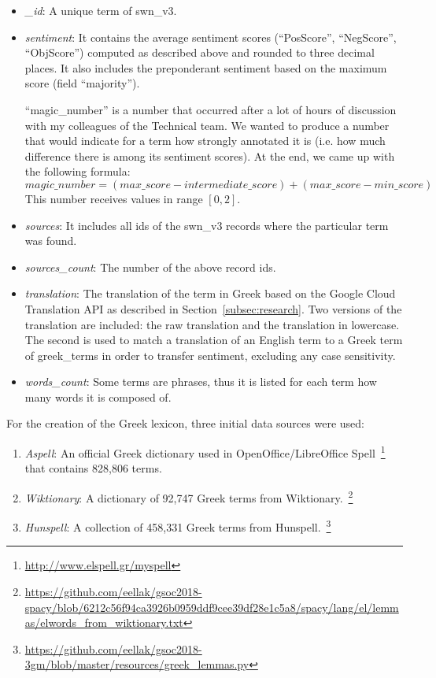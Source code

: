 \begin{itemize}
 \item \emph{\_id}: A unique term of swn\_v3.

 \item \emph{sentiment}: It contains the average sentiment scores
 (``PosScore'', ``NegScore'', ``ObjScore'') computed as described above
 and rounded to three decimal places.
 It also includes the preponderant sentiment based on the maximum score
 (field ``majority'').

 ``magic\_number'' is a number that occurred after a lot of hours
 of discussion with my colleagues of the Technical team.
 We wanted to produce a number that would indicate for a term
 how strongly annotated it is
 (i.e. how much difference there is among its sentiment scores).
 At the end, we came up with the following formula: \\
 $magic\_number = (max\_score - intermediate\_score) + (max\_score - min\_score)$ \\
 This number receives values in range $[0,2]$.
 
 \item \emph{sources}: It includes all ids of the swn\_v3 records
 where the particular term was found.
 
 \item \emph{sources\_count}: The number of the above record ids.
 
 \item \emph{translation}: The translation of the term in Greek
 based on the Google Cloud Translation API
 as described in Section~\ref{subsec:research}.
 Two versions of the translation are included:
 the raw translation and the translation in lowercase.
 The second is used to match a translation of an English term
 to a Greek term of greek\_terms in order to transfer sentiment,
 excluding any case sensitivity.
 
 \item \emph{words\_count}: Some terms are phrases, thus
 it is listed for each term how many words it is composed of.
\end{itemize}

\label{subsubsubsec:greek-terms}

For the creation of the Greek lexicon,
three initial data sources were used:

\begin{enumerate}
 \item \emph{Aspell}: An official Greek dictionary used in OpenOffice/LibreOffice Spell~\footnote{\url {http://www.elspell.gr/myspell}}
 that contains 828,806 terms.
    
 \item \emph{Wiktionary}: A dictionary of 92,747 Greek terms from Wiktionary.~\footnote{\url {https://github.com/eellak/gsoc2018-spacy/blob/6212c56f94ca3926b0959ddf9cee39df28e1c5a8/spacy/lang/el/lemmas/elwords_from_wiktionary.txt}}

 \item \emph{Hunspell}: A collection of 458,331 Greek terms from Hunspell.~\footnote{\url {https://github.com/eellak/gsoc2018-3gm/blob/master/resources/greek_lemmas.py}}
\end{enumerate}

